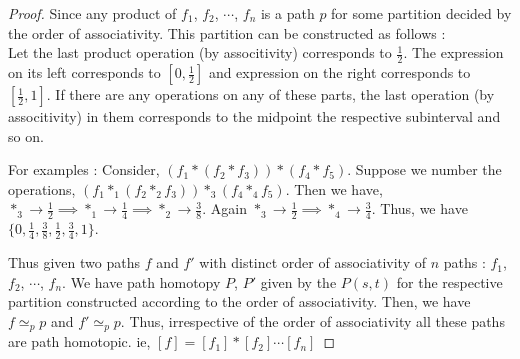 \begin{proof}
	Since any product of $f_1$, $f_2$, $\cdots$, $f_n$ is a path $p$ for some partition decided by the order of associativity. This partition can be constructed as follows :\\
	Let the last product operation (by associtivity) corresponds to $\frac{1}{2}$. The expression on its left corresponds to $[0,\frac{1}{2}]$ and expression on the right corresponds to $[\frac{1}{2},1]$. If there are any operations on any of these parts, the last operation (by associtivity) in them corresponds to the midpoint the respective subinterval and so on.\\

\begin{commentary}
	For examples : Consider, $(f_1 \ast ( f_2 \ast f_3)) \ast (f_4 \ast f_5)$. Suppose we number the operations, $(f_1 \ast_1 ( f_2 \ast_2 f_3)) \ast_3 (f_4 \ast_4 f_5)$. Then we have,  $\ast_3 \to \frac{1}{2} \implies \ast_1 \to \frac{1}{4} \implies \ast_2 \to \frac{3}{8}$. Again $\ast_3 \to \frac{1}{2} \implies \ast_4 \to \frac{3}{4}$. Thus, we have $\{0, \frac{1}{4}, \frac{3}{8}, \frac{1}{2}, \frac{3}{4},1 \}$.\\
\end{commentary}
	
	Thus given two paths $f$ and $f'$ with distinct order of associativity of $n$ paths : $f_1$, $f_2$, $\cdots$, $f_n$. We have path homotopy $P$, $P'$ given by the $P(s,t)$ for the respective partition constructed according to the order of associativity. Then, we have $f \simeq_p p$ and $f' \simeq_p p$. Thus, irrespective of the order of associativity all these paths are path homotopic. ie, $[f] = [f_1] \ast [f_2] \cdots [f_n]$
\end{proof}

